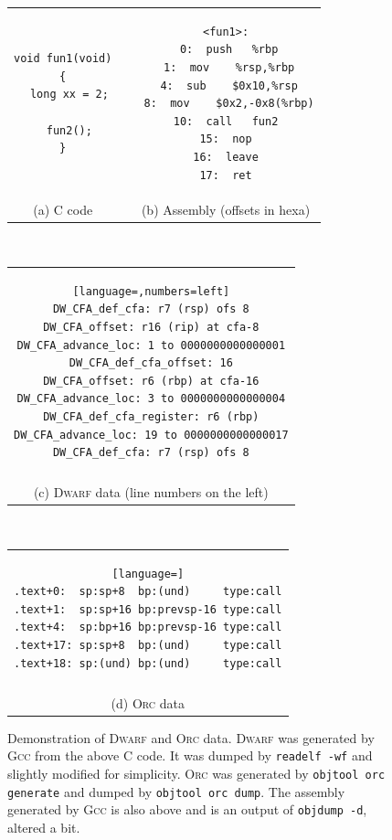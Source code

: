 \documentclass[10pt]{llncs}
\newcommand{\code}[2][]{\lstinline[columns=fullflexible, #1]$#2$}
\newcommand{\dwarf}{\textsc{Dwarf}\xspace}
\newcommand{\gcc}{\textsc{Gcc}\xspace}
\newcommand{\orc}{\textsc{Orc}\xspace}
\begin{document}
\begin{figure}[tb!]
  \begin{center}
    \begin{tabular}{cp{4em}c}
      \begin{lstlisting}
void fun1(void)
{
  long xx = 2;

  fun2();
}
      \end{lstlisting}
      &&
      \begin{lstlisting}[language={[x86masm]Assembler}]
<fun1>:
 0:  push   %rbp
 1:  mov    %rsp,%rbp
 4:  sub    $0x10,%rsp
 8:  mov    $0x2,-0x8(%rbp)
10:  call   fun2
15:  nop
16:  leave
17:  ret
      \end{lstlisting} %
      \\
      (a) C code && (b) Assembly (offsets in hexa) \\
    \end{tabular}
      \\[1ex]
    \begin{tabular}{c}
      {
	\begin{lstlisting}[language=,numbers=left]
DW_CFA_def_cfa: r7 (rsp) ofs 8
DW_CFA_offset: r16 (rip) at cfa-8
DW_CFA_advance_loc: 1 to 0000000000000001
DW_CFA_def_cfa_offset: 16
DW_CFA_offset: r6 (rbp) at cfa-16
DW_CFA_advance_loc: 3 to 0000000000000004
DW_CFA_def_cfa_register: r6 (rbp)
DW_CFA_advance_loc: 19 to 0000000000000017
DW_CFA_def_cfa: r7 (rsp) ofs 8
	\end{lstlisting} %
      }
      \\ \\
      (c) \dwarf data (line numbers on the left)
    \end{tabular}
      \\[1ex]
    \begin{tabular}{c}
      {
	\begin{lstlisting}[language=]
.text+0:  sp:sp+8  bp:(und)     type:call
.text+1:  sp:sp+16 bp:prevsp-16 type:call
.text+4:  sp:bp+16 bp:prevsp-16 type:call
.text+17: sp:sp+8  bp:(und)     type:call
.text+18: sp:(und) bp:(und)     type:call
	\end{lstlisting}
      }
      \\ \\
      (d) \orc data
    \end{tabular}
  \end{center}
    \caption{Demonstration of \dwarf and \orc data. \dwarf was generated by
    \gcc from the above C code. It was dumped by \code{readelf -wf} and
    slightly modified for simplicity. \orc was generated by \code{objtool orc
    generate} and dumped by \code{objtool orc dump}.  The assembly generated
    by \gcc is also above and is an output of \code{objdump -d}, altered a
    bit.}
  \label{fig:dwarf}
\end{figure}
\end{document}
